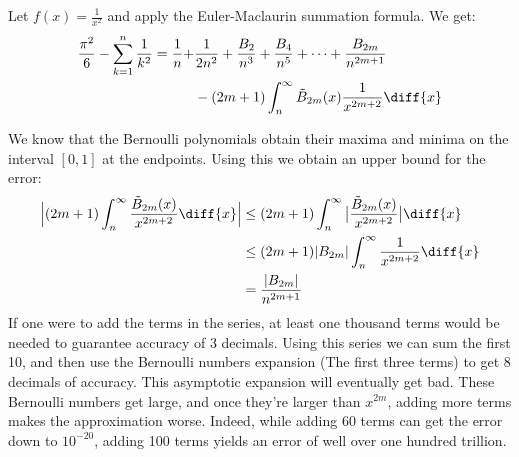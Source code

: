         \begin{lexample}
            Let $f(x)=\frac{1}{x^{2}}$ and apply the Euler-Maclaurin
            summation formula. We get:
            \begin{equation}
                \begin{split}
                    \frac{\pi^{2}}{6}-\sum_{k=1}^{n}\frac{1}{k^{2}}
                    =\frac{1}{n}+
                        &\frac{1}{2n^{2}}+\frac{B_{2}}{n^{3}}+
                        \frac{B_{4}}{n^{5}}+\cdots+
                        \frac{B_{2m}}{n^{2m+1}}\\
                        &-(2m+1)\int_{n}^{\infty}
                            \tilde{B}_{2m}(x)\frac{1}{x^{2m+2}}\diff{x}
                \end{split}
            \end{equation}
        \end{lexample}
        We know that the Bernoulli polynomials obtain their maxima and
        minima on the interval $[0,1]$ at the endpoints. Using this
        we obtain an upper bound for the error:
        \begin{align}
            \Big|(2m+1)\int_{n}^{\infty}
                \frac{\tilde{B}_{2m}(x)}{x^{2m+2}}\diff{x}\Big|
                &\leq(2m+1)\int_{n}^{\infty}
                    \big|\frac{\tilde{B}_{2m}(x)}{x^{2m+2}}\big|\diff{x}\\
                &\leq(2m+1)|B_{2m}|\int_{n}^{\infty}
                    \frac{1}{x^{2m+2}}\diff{x}\\
                &=\frac{|B_{2m}|}{n^{2m+1}}
        \end{align}
        If one were to add the terms in the series, at least one thousand
        terms would be needed to guarantee accuracy of 3 decimals. Using this
        series we can sum the first 10, and then use the Bernoulli numbers
        expansion (The first three terms) to get 8 decimals of accuracy.
        This asymptotic expansion will eventually get bad. These Bernoulli
        numbers get large, and once they're larger than $x^{2m}$, adding
        more terms makes the approximation worse. Indeed, while adding
        60 terms can get the error down to $10^{-20}$, adding 100 terms yields
        an error of well over one hundred trillion.
